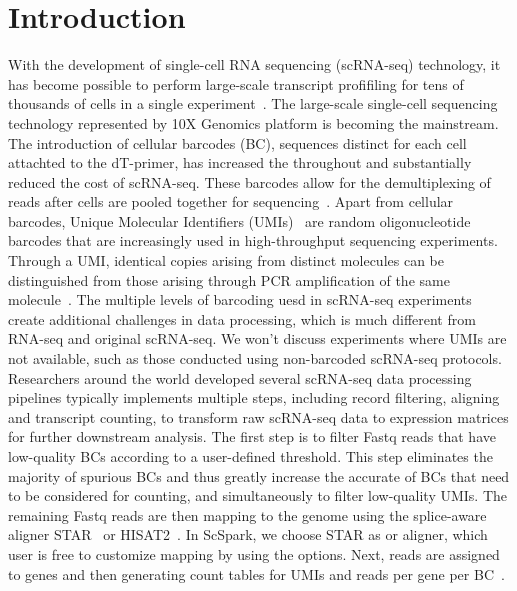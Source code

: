 \documentclass[runningheads]{llncs}
\begin{document}
\section{Introduction}

With the development of single-cell RNA sequencing (scRNA-seq) technology, it has become possible to perform large-scale transcript profifiling for tens of thousands of cells in a single experiment~\cite{gao2020Comparison}.
The large-scale single-cell sequencing technology represented by 10X Genomics platform is becoming the mainstream. 
The introduction of cellular barcodes (BC), sequences distinct for each cell attachted to the dT-primer, has increased the throughout and substantially reduced the cost of scRNA-seq.
These barcodes allow for the demultiplexing of reads after cells are pooled together for sequencing~\cite{tian2018scPipe}. 
Apart from cellular barcodes, Unique Molecular Identifiers (UMIs)\cite{Kivioja2012Counting}~\cite{camara2017Methods} are random oligonucleotide barcodes that are increasingly used in high-throughput sequencing experiments.
Through a UMI, identical copies arising from distinct molecules can be distinguished from those arising through PCR amplification of the same molecule~\cite{smith2017UMI}.
The multiple levels of barcoding uesd in scRNA-seq experiments create additional challenges in data processing, which is much different from RNA-seq and original scRNA-seq.
We won't discuss experiments where UMIs are not available, such as those conducted using non-barcoded scRNA-seq protocols.
Researchers around the world developed several scRNA-seq data processing pipelines typically implements multiple steps, including record filtering, aligning and transcript counting, to transform raw scRNA-seq data to expression matrices for further downstream analysis.
The first step is to filter Fastq reads that have low-quality BCs according to a user-defined threshold.
This step eliminates the majority of spurious BCs and thus greatly increase the accurate of BCs that need to be considered for counting, and simultaneously to filter low-quality UMIs.
The remaining Fastq reads are then mapping to the genome using the splice-aware aligner STAR~\cite{dobin2012RNA} or HISAT2~\cite{kim2015hisat}.
In ScSpark, we choose STAR as or aligner, which user is free to customize mapping by using the options.
Next, reads are assigned to genes and then generating count tables for UMIs and reads per gene per BC~\cite{swati0zUMIs}.
\end{document}
